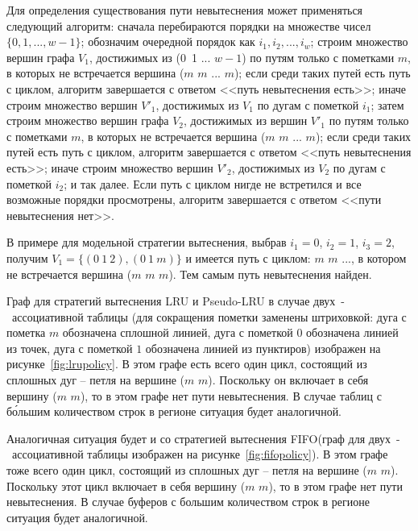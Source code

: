 \documentclass[14pt]{extreport}
\newcommand{\LRU}{\textsf{LRU}\xspace}
\newcommand{\FIFO}{\textsf{FIFO}\xspace}
\newcommand{\PseudoLRU}{\textsf{Pseudo-LRU}\xspace}
\begin{document}
Для определения существования пути невытеснения может применяться
следующий алгоритм: сначала перебираются порядки на множестве чисел
$\{0, 1, ..., w{-}1\}$; обозначим очередной порядок как $i_1, i_2,
..., i_w$; строим множество вершин графа $V_1$, достижимых из (0~1
... $w{-}1$) по путям только с пометками $m$, в которых не встречается вершина ($m$ $m$ ... $m$); если среди таких путей есть путь с циклом,
алгоритм завершается с ответом <<путь невытеснения есть>>; иначе
строим множество вершин $V'_1$, достижимых из $V_1$ по дугам с
пометкой $i_1$; затем строим множество вершин графа $V_2$, достижимых из
вершин $V'_1$ по путям только с пометками $m$, в которых не встречается вершина ($m$ $m$ ... $m$); если среди таких путей есть путь с циклом,
алгоритм завершается с ответом <<путь невытеснения есть>>; иначе
строим множество вершин $V'_2$, достижимых из $V_2$ по дугам с
пометкой $i_2$; и так далее. Если путь с циклом нигде не встретился и все
возможные порядки просмотрены, алгоритм завершается с ответом <<пути
невытеснения нет>>.

В примере для модельной стратегии вытеснения, выбрав $i_1 = 0$, $i_2 = 1$, $i_3 = 2$, получим $V_1 = \{ (0~1~2), (0~1~m) \}$ и имеется путь с циклом: $m$ $m$ ..., в котором не встречается вершина ($m$ $m$ $m$). Тем самым путь невытеснения найден.

Граф для стратегий вытеснения \LRU и \PseudoLRU в случае
двух~-~ассоциативной таблицы (для сокращения пометки заменены
штриховкой: дуга с пометка $m$ обозначена сплошной линией, дуга с
пометкой $0$ обозначена линией из точек, дуга с пометкой $1$
обозначена линией из пунктиров) изображен на
рисунке~\ref{fig:lrupolicy}. В этом графе есть всего один цикл,
состоящий из сплошных дуг -- петля на вершине ($m$ $m$). Поскольку он включает
в себя вершину ($m$ $m$), то в этом графе нет пути невытеснения.
В случае таблиц с б\'{о}льшим количеством строк в регионе ситуация будет
аналогичной.

Аналогичная ситуация будет и со стратегией вытеснения \FIFO (граф
для двух~-~ассоциативной таблицы изображен на рисунке~\ref{fig:fifopolicy}). В этом графе тоже всего один цикл, состоящий из сплошных дуг -- петля на вершине ($m$ $m$). Поскольку
этот цикл включает в себя вершину ($m$ $m$), то в этом графе нет
пути невытеснения. В случае буферов с большим количеством строк в регионе
ситуация будет аналогичной.
\end{document}
